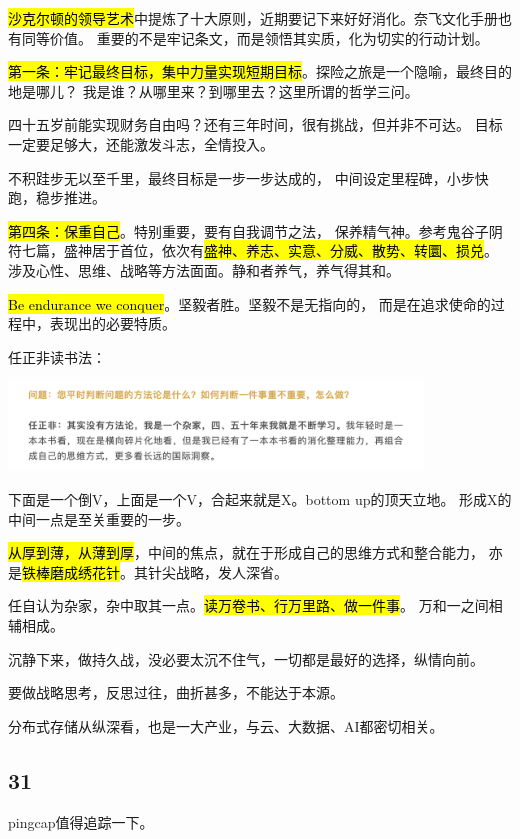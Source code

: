 \hl{沙克尔顿的领导艺术}中提炼了十大原则，近期要记下来好好消化。奈飞文化手册也有同等价值。
重要的不是牢记条文，而是领悟其实质，化为切实的行动计划。

\hl{第一条：牢记最终目标，集中力量实现短期目标}。探险之旅是一个隐喻，最终目的地是哪儿？
我是谁？从哪里来？到哪里去？这里所谓的哲学三问。

四十五岁前能实现财务自由吗？还有三年时间，很有挑战，但并非不可达。
目标一定要足够大，还能激发斗志，全情投入。

不积跬步无以至千里，最终目标是一步一步达成的，
中间设定里程碑，小步快跑，稳步推进。

\hl{第四条：保重自己}。特别重要，要有自我调节之法，
保养精气神。参考鬼谷子阴符七篇，盛神居于首位，依次有\hl{盛神、养志、实意、分威、散势、转圜、损兑}。
涉及心性、思维、战略等方法面面。静和者养气，养气得其和。

\hl{Be endurance we conquer}。坚毅者胜。坚毅不是无指向的，
而是在追求使命的过程中，表现出的必要特质。

\hrulefill

任正非读书法：
\begin{center}
\includegraphics[width=11cm]{../imgs/renzhengfei-reading.png}
\end{center}

下面是一个倒V，上面是一个V，合起来就是X。bottom up的顶天立地。
形成X的中间一点是至关重要的一步。

\hl{从厚到薄，从薄到厚}，中间的焦点，就在于形成自己的思维方式和整合能力，
亦是\hl{铁棒磨成绣花针}。其针尖战略，发人深省。

任自认为杂家，杂中取其一点。\hl{读万卷书、行万里路、做一件事}。
万和一之间相辅相成。

\hrulefill

沉静下来，做持久战，没必要太沉不住气，一切都是最好的选择，纵情向前。

要做战略思考，反思过往，曲折甚多，不能达于本源。

分布式存储从纵深看，也是一大产业，与云、大数据、AI都密切相关。

\subsection{31}

pingcap值得追踪一下。
